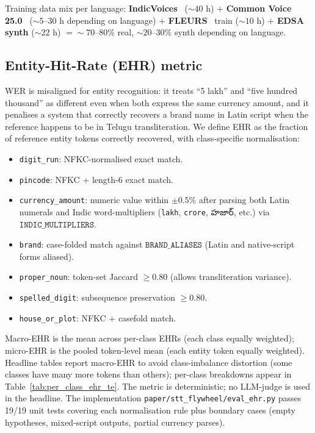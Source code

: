 \documentclass[conference,a4paper]{IEEEtran}
\begin{document}
Training data mix per language: \textbf{IndicVoices}~\cite{indicvoices_2024} ($\sim 40$ h) + \textbf{Common Voice 25.0}~\cite{commonvoice_25} ($\sim 5$--$30$ h depending on language) + \textbf{FLEURS}~\cite{fleurs_2023} train ($\sim 10$ h) + \textbf{EDSA synth} ($\sim 22$ h) $= \sim 70$--$80$\% real, $\sim 20$--$30$\% synth depending on language.

\subsection{Entity-Hit-Rate (EHR) metric}\label{sec:ehr}

WER is misaligned for entity recognition: it treats ``5 lakh'' and ``five hundred thousand'' as different even when both express the same currency amount, and it penalises a system that correctly recovers a brand name in Latin script when the reference happens to be in Telugu transliteration. We define EHR as the fraction of reference entity tokens correctly recovered, with class-specific normalisation:

\begin{itemize}
\item \texttt{digit\_run}: NFKC-normalised exact match.
\item \texttt{pincode}: NFKC + length-6 exact match.
\item \texttt{currency\_amount}: numeric value within $\pm 0.5$\% after parsing both Latin numerals and Indic word-multipliers (\texttt{lakh}, \texttt{crore}, {\telugufont హజార్}, etc.) via $\texttt{INDIC\_MULTIPLIERS}$.
\item \texttt{brand}: case-folded match against $\texttt{BRAND\_ALIASES}$ (Latin and native-script forms aliased).
\item \texttt{proper\_noun}: token-set Jaccard $\geq 0.80$ (allows transliteration variance).
\item \texttt{spelled\_digit}: subsequence preservation $\geq 0.80$.
\item \texttt{house\_or\_plot}: NFKC + casefold match.
\end{itemize}

Macro-EHR is the mean across per-class EHRs (each class equally weighted); micro-EHR is the pooled token-level mean (each entity token equally weighted). Headline tables report macro-EHR to avoid class-imbalance distortion (some classes have many more tokens than others); per-class breakdowns appear in Table~\ref{tab:per_class_ehr_te}. The metric is deterministic; no LLM-judge is used in the headline. The implementation \texttt{paper/stt\_flywheel/eval\_ehr.py} passes 19/19 unit tests covering each normalisation rule plus boundary cases (empty hypotheses, mixed-script outputs, partial currency parses).
\end{document}
